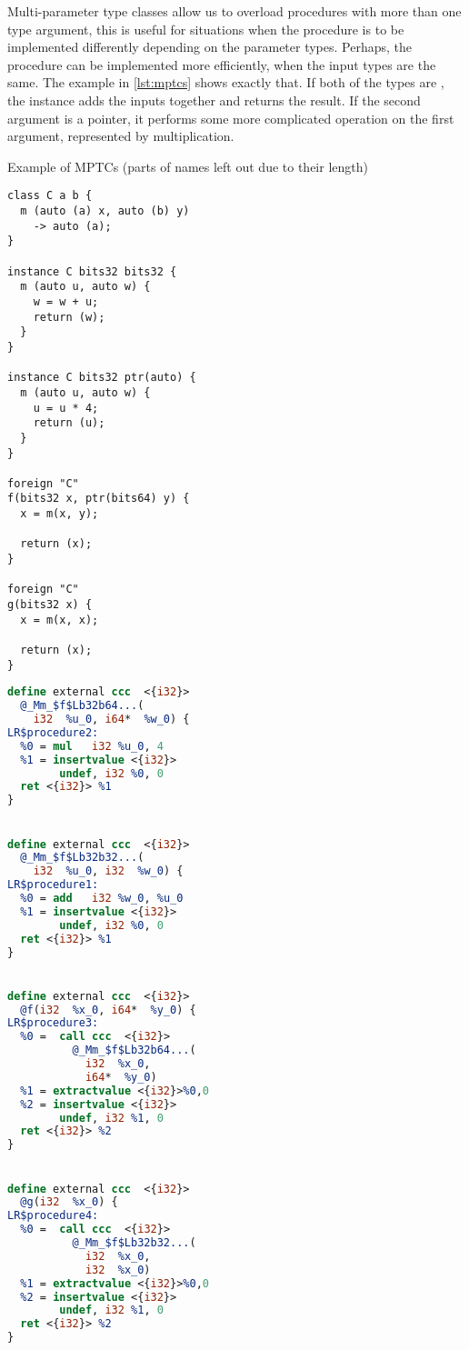 Multi-parameter type classes allow us to overload procedures with more than one type argument, this is useful for situations when the procedure is to be implemented differently depending on the parameter types. Perhaps, the procedure can be implemented more efficiently, when the input types are the same. The example in \cref{lst:mptcs} shows exactly that. If both of the types are , the instance adds the inputs together and returns the result. If the second argument is a pointer, it performs some more complicated operation on the first argument, represented by multiplication.
\begin{listing}
    \small
    \caption{Example of MPTCs (parts of names left out due to their length)}
    \label{lst:mptcs}
    \begin{center}
    \begin{minipage}{0.5\linewidth}
    \begin{lstlisting}
class C a b {
  m (auto (a) x, auto (b) y)
    -> auto (a);
}

instance C bits32 bits32 {
  m (auto u, auto w) {
    w = w + u;
    return (w);
  }
}

instance C bits32 ptr(auto) {
  m (auto u, auto w) {
    u = u * 4;
    return (u);
  }
}

foreign "C"
f(bits32 x, ptr(bits64) y) {
  x = m(x, y);

  return (x);
}

foreign "C"
g(bits32 x) {
  x = m(x, x);

  return (x);
}
    \end{lstlisting}
    \end{minipage}%
    \begin{minipage}{0.5\linewidth}
    \begin{lstlisting}[language=LLVM]
define external ccc  <{i32}>
  @_Mm_$f$Lb32b64...(
    i32  %u_0, i64*  %w_0) {
LR$procedure2:
  %0 = mul   i32 %u_0, 4
  %1 = insertvalue <{i32}>
        undef, i32 %0, 0
  ret <{i32}> %1
}


define external ccc  <{i32}>
  @_Mm_$f$Lb32b32...(
    i32  %u_0, i32  %w_0) {
LR$procedure1:
  %0 = add   i32 %w_0, %u_0
  %1 = insertvalue <{i32}>
        undef, i32 %0, 0
  ret <{i32}> %1
}


define external ccc  <{i32}>
  @f(i32  %x_0, i64*  %y_0) {
LR$procedure3:
  %0 =  call ccc  <{i32}>
          @_Mm_$f$Lb32b64...(
            i32  %x_0,
            i64*  %y_0)
  %1 = extractvalue <{i32}>%0,0
  %2 = insertvalue <{i32}>
        undef, i32 %1, 0
  ret <{i32}> %2
}


define external ccc  <{i32}>
  @g(i32  %x_0) {
LR$procedure4:
  %0 =  call ccc  <{i32}>
          @_Mm_$f$Lb32b32...(
            i32  %x_0,
            i32  %x_0)
  %1 = extractvalue <{i32}>%0,0
  %2 = insertvalue <{i32}>
        undef, i32 %1, 0
  ret <{i32}> %2
}
    \end{lstlisting}
    \end{minipage}
    \end{center}
\end{listing}

